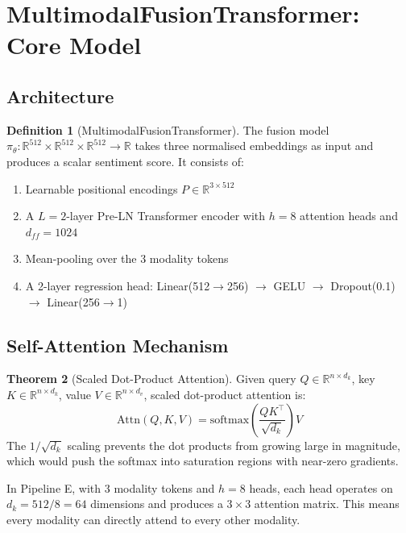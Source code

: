 \documentclass[12pt,a4paper]{article}
\theoremstyle{definition}
\newtheorem{theorem}{Theorem}[section]
\newtheorem{definition}[theorem]{Definition}
\begin{document}
\section{MultimodalFusionTransformer: Core Model}

\subsection{Architecture}

\begin{definition}[MultimodalFusionTransformer]
The fusion model $\pi_\theta: \mathbb{R}^{512} \times \mathbb{R}^{512} \times \mathbb{R}^{512} \to \mathbb{R}$ takes three normalised embeddings as input and produces a scalar sentiment score. It consists of:
\begin{enumerate}[nosep]
  \item Learnable positional encodings $P \in \mathbb{R}^{3 \times 512}$
  \item A $L=2$-layer Pre-LN Transformer encoder with $h=8$ attention heads and $d_{ff}=1024$
  \item Mean-pooling over the 3 modality tokens
  \item A 2-layer regression head: Linear(512$\to$256) $\to$ GELU $\to$ Dropout(0.1) $\to$ Linear(256$\to$1)
\end{enumerate}
\end{definition}

\subsection{Self-Attention Mechanism}

\begin{theorem}[Scaled Dot-Product Attention]
Given query $Q \in \mathbb{R}^{n \times d_k}$, key $K \in \mathbb{R}^{n \times d_k}$, value $V \in \mathbb{R}^{n \times d_v}$, scaled dot-product attention is:
$$\text{Attn}(Q, K, V) = \text{softmax}\!\left(\frac{QK^\top}{\sqrt{d_k}}\right) V$$
The $1/\sqrt{d_k}$ scaling prevents the dot products from growing large in magnitude, which would push the softmax into saturation regions with near-zero gradients.
\end{theorem}

In Pipeline E, with 3 modality tokens and $h=8$ heads, each head operates on $d_k = 512/8 = 64$ dimensions and produces a $3 \times 3$ attention matrix. This means every modality can directly attend to every other modality.
\end{document}
